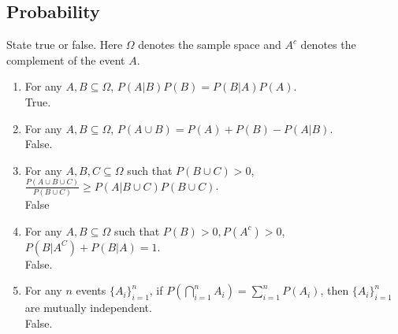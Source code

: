 \documentclass[a4paper]{article}
\theoremstyle{definition}
\newenvironment{soln}{
    \leavevmode\color{blue}\ignorespaces
}{}
\begin{document}
\subsection{Probability}
State true or false. Here $\Omega$ denotes the sample space and $A^c$ denotes the complement of the event $A$.
\begin{enumerate}
\item For any $A, B \subseteq \Omega$, $P(A|B)P(B) = P(B|A)P(A)$.\\
  \begin{soln}  True. \end{soln}
\item For any $A, B \subseteq \Omega$, $P(A \cup B) = P(A) + P(B) - P(A | B)$.\\         
  \begin{soln} False. \end{soln}
\item For any $A, B, C \subseteq \Omega$ such that $P(B \cup C) > 0$,
  $\frac{P(A \cup B \cup C)}{P(B \cup C)} \geq P(A | B \cup C) P(B \cup C)$.\\ \begin{soln}  False \end{soln}
\item For any $A, B\subseteq\Omega$ such that $P(B) > 0, P(A^c) > 0$,
  $P(B|A^C) + P(B|A) = 1$.\\ 
  \begin{soln}  False. \end{soln}
\item For any $n$ events $\{A_i\}_{i=1}^n$, if
  $P(\bigcap_{i=1}^n A_i) = \sum_{i=1}^n P(A_i)$, then
  $\{A_i\}_{i=1}^n$ are mutually independent.\\
  \begin{soln}  False. \end{soln}
\end{enumerate}
\end{document}
